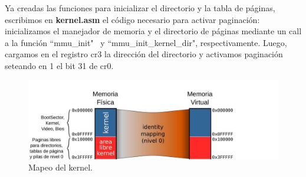 \documentclass[a4paper]{article}
\begin{document}
\newpage 
\justify  
Ya creadas las funciones para inicializar el directorio y la tabla de páginas, escribimos en \textbf{kernel.asm} el código necesario para activar paginación: inicializamos el manejador de memoria y el directorio de páginas mediante un call a la función ``mmu_init" \ y ``mmu_init_kernel_dir", respectivamente. Luego, cargamos en el registro cr3 la dirección del directorio y activamos paginación seteando en 1 el bit 31 de cr0.

\begin{figure}[h]
	\centering
	\includegraphics[scale=0.5]{img/MapearKernel.pdf}
	\caption{Mapeo del kernel.}
\end{figure}
\end{document}

